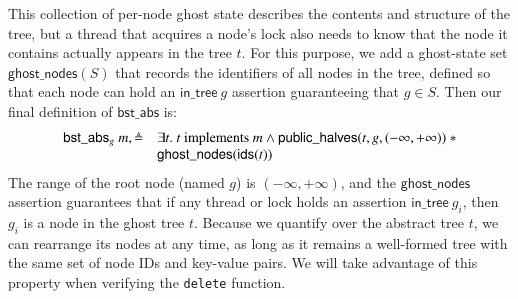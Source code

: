 \documentclass[runningheads]{llncs}
\newcommand{\treerep}{\ensuremath{\mathsf{bst\_abs}}}
\begin{document}
This collection of per-node ghost state describes the contents and structure of the tree, but a thread that acquires a node's lock also needs to know that the node it contains actually appears in the tree $t$. For this purpose, we add a ghost-state set $\mathsf{ghost\_nodes}(S)$ that records the identifiers of all nodes in the tree, defined so that each node can hold an $\mathsf{in\_tree}\ g$ assertion guaranteeing that $g \in S$. Then our final definition of $\treerep$ is:
$$\begin{array}{r l}\treerep_g\ m, \triangleq &\exists t.\ t \textrm{ implements } m \land \mathsf{public\_halves}(t, g, (-\infty, +\infty))\ * \\&\mathsf{ghost\_nodes}(\mathsf{ids}(t))\end{array}$$
The range of the root node (named $g$) is $(-\infty, +\infty)$, and the $\mathsf{ghost\_nodes}$ assertion guarantees that if any thread or lock holds an assertion $\mathsf{in\_tree}\ g_i$, then $g_i$ is a node in the ghost tree $t$. Because we quantify over the abstract tree $t$, we can rearrange its nodes at any time, as long as it remains a well-formed tree with the same set of node IDs and key-value pairs. We will take advantage of this property when verifying the \lstinline{delete} function.
\end{document}
